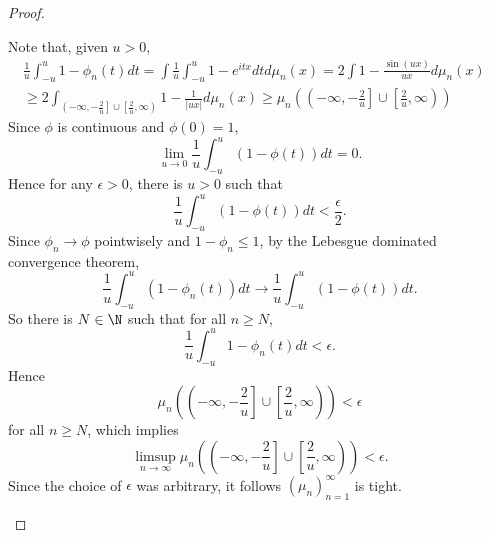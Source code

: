 \documentclass[stat901]{subfiles}
\begin{document}
\begin{proof}
\begin{claim}
            Note that, given $u>0$,
            \begin{equation*}
                \begin{aligned}
                    \frac{1}{u} \int^{u}_{-u} 1-\phi_n\left( t \right) dt = \int \frac{1}{u} \int^{u}_{-u} 1-e^{itx}dt d\mu_n\left( x \right) = 2 \int 1-\frac{\sin\left( ux \right)}{ux} d\mu_n\left( x \right) & \\
                    \geq 2 \int^{}_{\left( -\infty,-\frac{2}{u} \right]\cup\left[ \frac{2}{u},\infty \right)} 1-\frac{1}{\left| ux \right|} d\mu_n\left( x \right) \geq \mu_n\left( \left( -\infty, -\frac{2}{u} \right]\cup\left[ \frac{2}{u},\infty \right)\right)
                \end{aligned} 
            \end{equation*}
            Since $\phi$ is continuous and $\phi\left( 0 \right)=1$,
            \begin{equation*}
                \lim_{u\to 0} \frac{1}{u}\int^{u}_{-u} \left( 1-\phi\left( t \right) \right)dt = 0.
            \end{equation*}
            Hence for any $\epsilon>0$, there is $u>0$ such that
            \begin{equation*}
                \frac{1}{u} \int^{u}_{-u} \left( 1-\phi\left( t \right) \right)dt < \frac{\epsilon}{2}.
            \end{equation*}
            Since $\phi_n\to\phi$ pointwisely and $1-\phi_n\leq 1$, by the Lebesgue dominated convergence theorem,
            \begin{equation*}
                \frac{1}{u} \int^{u}_{-u} \left( 1-\phi_n\left( t \right) \right)dt \to \frac{1}{u} \int^{u}_{-u} \left( 1-\phi\left( t \right) \right)dt.
            \end{equation*}
            So there is $N\in\N$ such that for all $n\geq N$,
            \begin{equation*}
                \frac{1}{u} \int^{u}_{-u} 1-\phi_n\left( t \right)dt < \epsilon.
            \end{equation*}
            Hence
            \begin{equation*}
                \mu_n\left( \left( -\infty,-\frac{2}{u} \right]\cup\left[ \frac{2}{u},\infty \right) \right) < \epsilon
            \end{equation*}
            for all $n\geq N$, which implies
            \begin{equation*}
                \limsup_{n\to\infty} \mu_n\left( \left( -\infty,-\frac{2}{u} \right]\cup\left[ \frac{2}{u},\infty \right) \right) < \epsilon.
            \end{equation*}
            Since the choice of $\epsilon$ was arbitrary, it follows $\left( \mu_{n} \right)^{\infty}_{n=1}$ is tight.
        \end{claim}


\end{proof}
\end{document}
